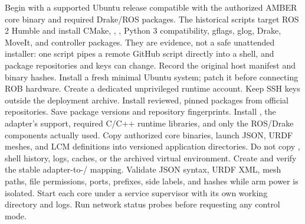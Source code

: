 {}
\markdownRendererSectionEnd \markdownRendererSectionBegin
{}\markdownRendererInterblockSeparator
{}Begin with a supported Ubuntu release compatible with the authorized AMBER core binary and required Drake/ROS packages. The historical scripts target ROS 2 Humble and install CMake, , , Python 3 compatibility, gflags, glog, Drake, MoveIt, and controller packages. They are evidence, not a safe unattended installer: one script pipes a remote GitHub script directly into a shell, and package repositories and keys can change.\markdownRendererInterblockSeparator
{}\markdownRendererSectionBegin
{}\markdownRendererInterblockSeparator
{}\markdownRendererOlBegin
{}Record the original host manifest and binary hashes.\markdownRendererOlItemEnd 
{}Install a fresh minimal Ubuntu system; patch it before connecting ROB hardware.\markdownRendererOlItemEnd 
{}Create a dedicated unprivileged runtime account. Keep SSH keys outside the deployment archive.\markdownRendererOlItemEnd 
{}Install reviewed, pinned packages from official repositories. Save package versions and repository fingerprints.\markdownRendererOlItemEnd 
{}Install , the adapter's  support, required C/C++ runtime libraries, and only the ROS/Drake components actually used.\markdownRendererOlItemEnd 
{}Copy authorized core binaries, launch JSON, URDF meshes, and LCM definitions into versioned application directories. Do not copy , shell history, logs, caches, or the archived virtual environment.\markdownRendererOlItemEnd 
{}Create and verify the stable adapter-to-/ mapping.\markdownRendererOlItemEnd 
{}Validate JSON syntax, URDF XML, mesh paths, file permissions, ports, prefixes, side labels, and hashes while arm power is isolated.\markdownRendererOlItemEnd 
{}Start each core under a service supervisor with its own working directory and logs.\markdownRendererOlItemEnd 
{}Run network status probes before requesting any control mode.\markdownRendererOlItemEnd 

